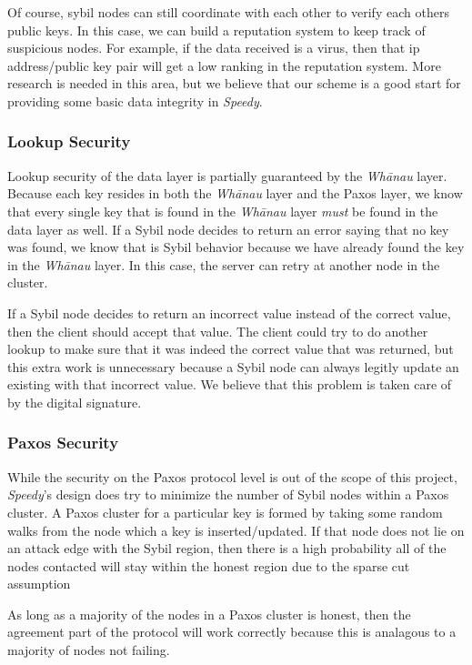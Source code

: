 \documentclass[letter]{article}
\newcommand{\sys}{\textit{Speedy}}
\newcommand{\whanau}{\textit{Wh\={a}nau}}
\begin{document}
Of course, sybil nodes can still coordinate with each other to verify each others public keys. In this case, we can build a reputation system to keep track of suspicious nodes. For example, if the data received is a virus, then that ip address/public key pair will get a low ranking in the reputation system. More research is needed in this area, but we believe that our scheme is a good start for providing some basic data integrity in \sys.

\subsubsection{Lookup Security}

Lookup security of the data layer is partially guaranteed by the \whanau{} layer. Because each key resides
in both the \whanau{} layer and the Paxos layer, we know that every single key that is found in the \whanau{}
layer \emph{must} be found in the data layer as well. If a Sybil node decides to return an error saying that
no key was found, we know that is Sybil behavior because we have already found the key in the \whanau{} layer.
In this case, the server can retry at another node in the cluster.

If a Sybil node decides to return an incorrect value instead of the correct value, then the client should accept 
that value. The client could try to do another lookup to make sure that it was indeed the correct value that was returned,
but this extra work is unnecessary because a Sybil node can always legitly update an existing with that incorrect
value. We believe that this problem is taken care of by the digital signature.


\subsubsection{Paxos Security}
While the security on the Paxos protocol level is out of the scope of this project, \sys's
design does try to minimize the number of Sybil nodes within a Paxos cluster.
A Paxos cluster for a particular key is formed by taking some random walks from the node which a key is inserted/updated.
If that node does not lie on an attack edge with the Sybil region, then there is a high probability
all of the nodes contacted will stay within the honest region due to the sparse cut assumption

As long as a majority of the nodes in a Paxos cluster is honest, then the agreement part of the protocol
will work correctly because this is analagous to a majority of nodes not failing.
\end{document}
